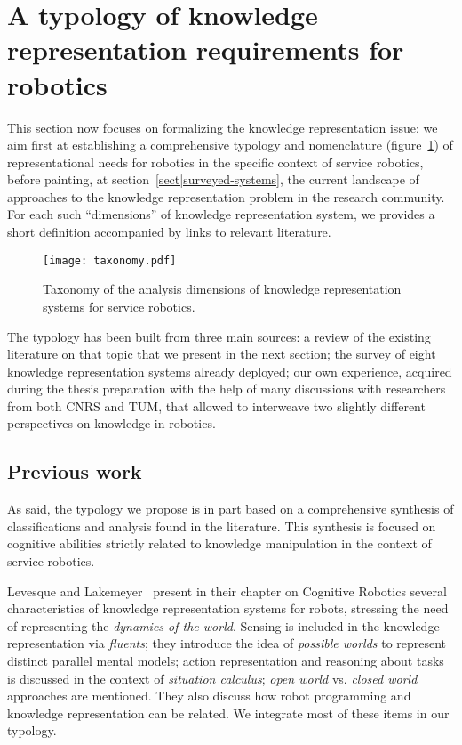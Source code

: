 \section{A typology of knowledge representation requirements for robotics}
\label{sect|features}

This section now focuses on formalizing the knowledge representation issue: we
aim first at establishing a comprehensive typology and nomenclature
(figure~\ref{fig|taxo}) of representational needs for robotics in the specific
context of service robotics, before painting, at
section~\ref{sect|surveyed-systems}, the current landscape of approaches to the
knowledge representation problem in the research community. For each such
``dimensions'' of knowledge representation system, we provides a short
definition accompanied by links to relevant literature.

\begin{figure}
        \centering
        \texttt{[image: taxonomy.pdf]}
        \caption{Taxonomy of the analysis dimensions of knowledge
        representation systems for service robotics.}
        \label{fig|taxo}
\end{figure}

The typology has been built from three main sources: a review of the existing
literature on that topic that we present in the next section; the survey of
eight knowledge representation systems already deployed; our own experience,
acquired during the thesis preparation with the help of many discussions with
researchers from both CNRS and TUM, that allowed to interweave two slightly
different perspectives on knowledge in robotics.

\subsection{Previous work}
\label{sect|evaluation-literature}

As said, the typology we propose is in part based on a comprehensive synthesis of
classifications and analysis found in the literature. This synthesis is focused
on cognitive abilities strictly related to knowledge manipulation in the
context of service robotics.

Levesque and Lakemeyer~\cite{Levesque2008} present in their chapter on
Cognitive Robotics several characteristics of knowledge representation systems
for robots, stressing the need of representing the \emph{dynamics of the
world}.  Sensing is included in the knowledge representation via
\emph{fluents}; they introduce the idea of \emph{possible worlds} to represent
distinct parallel mental models; action representation and reasoning about
tasks is discussed in the context of \emph{situation calculus}; \emph{open
world} vs. \emph{closed world} approaches are mentioned.  They also discuss how
robot programming and knowledge representation can be related. We integrate
most of these items in our typology.


